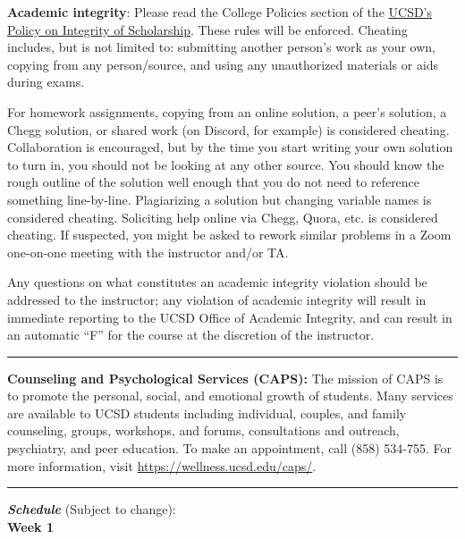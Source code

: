 \documentclass[12pt]{article}
\begin{document}
\noindent\textbf{Academic integrity}: Please read the College Policies section of the \href{http://senate.ucsd.edu/Operating-Procedures/Senate-Manual/Appendices/2}{UCSD's Policy on Integrity of Scholarship}.
These rules will be enforced.
Cheating includes, but is not limited to: submitting another person's work as your own, copying from any person/source, and using any unauthorized materials or aids during exams.

For homework assignments, copying from an online solution, a peer's solution, a Chegg solution, or shared work (on Discord, for example) is considered cheating.
Collaboration is encouraged, but by the time you start writing your own solution to turn in, you should not be looking at any other source.
You should know the rough outline of the solution well enough that you do not need to reference something line-by-line.
Plagiarizing a solution but changing variable names is considered cheating.
Soliciting help online via Chegg, Quora, etc. is considered cheating.
If suspected, you might be asked to rework similar problems in a Zoom one-on-one meeting with the instructor and/or TA.

Any questions on what constitutes an academic integrity violation should be addressed to the instructor; any violation of academic integrity will result in immediate reporting to the UCSD Office of Academic Integrity, and can result in an automatic ``F'' for the course at the discretion of the instructor.

\begin{center}
	\rule{\textwidth}{0.5pt}
\end{center}

\noindent\textbf{Counseling and Psychological Services (CAPS):} The mission of CAPS is to promote the personal, social, and emotional growth of students.
Many services are available to UCSD students including individual, couples, and family counseling, groups, workshops, and forums, consultations and outreach, psychiatry, and peer education.
To make an appointment, call (858) 534-755.
For more information, visit \href{https://wellness.ucsd.edu/caps/}{https://wellness.ucsd.edu/caps/}.

\begin{center}
	\rule{\textwidth}{0.5pt}
\end{center}

\noindent\textbf{\emph{Schedule}} (Subject to change):\\

\noindent\textbf{Week 1}
\end{document}
